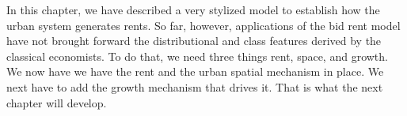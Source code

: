 In this chapter, we have described a very stylized model to  establish how the urban system generates rents.
So far, however, applications of the bid rent model have not brought forward the distributional and class features derived by the classical economists. To do that, we need three things rent, space, and growth. We now have we have the rent and the urban spatial mechanism in place. We next have to add the growth mechanism that drives it. That is what the next chapter will develop.







